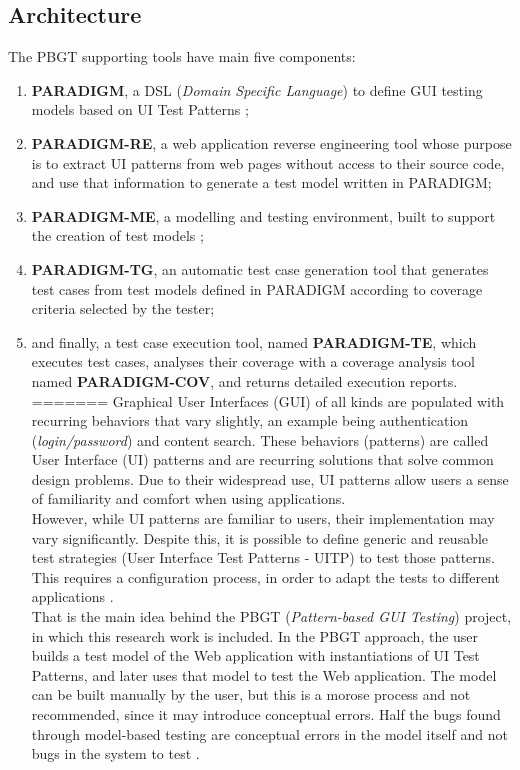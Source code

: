 \documentclass[conference]{IEEEtran}
\begin{document}
\subsection{Architecture}
The PBGT supporting tools have main five components: 
\begin{enumerate}
\item \textbf{PARADIGM}, a DSL (\textit{Domain Specific Language}) to define GUI testing models based on UI Test Patterns \cite{enase14}; 
\item \textbf{PARADIGM-RE}, a web application reverse engineering tool whose purpose is to extract UI patterns from web pages without access to their source code, and use that information to generate a test model written in PARADIGM; 
\item \textbf{PARADIGM-ME}, a modelling and testing environment, built to support the creation of test models \cite{conf_icst_MonteiroP13}; 
\item  \textbf{PARADIGM-TG}, an automatic test case generation tool that generates test cases from test models defined in PARADIGM according to coverage criteria selected by the tester; 
\item and finally, a test case execution tool, named \textbf{PARADIGM-TE}, which executes test cases, analyses their coverage with a coverage analysis tool named \textbf{PARADIGM-COV}\cite{vilela2014cov}, and returns detailed execution reports. 
=======
Graphical User Interfaces (GUI) of all kinds are populated with recurring behaviors that vary slightly, an example being authentication (\textit{login/password}) and content search. These behaviors (patterns) are called User Interface (UI) patterns \cite{van2001patterns} and are recurring solutions that solve common design problems. Due to their widespread use, UI patterns allow users a sense of familiarity and comfort when using applications. \\

However, while UI patterns are familiar to users, their implementation may vary significantly.  Despite this, it is possible to define generic and reusable test strategies (User Interface Test Patterns - UITP) to test those patterns. This requires a configuration process, in order to adapt the tests to different applications \cite{morgado2012gui}. \\

That is the main idea behind the PBGT (\textit{Pattern-based GUI Testing}) project, in which this research work is included. In the PBGT approach, the user builds a test model of the Web application with instantiations of UI Test Patterns, and later uses that model to test the Web application. The model can be built manually by the user, but this is a morose process and not recommended, since it may introduce conceptual errors. Half the bugs found through model-based testing are conceptual errors in the model itself and not bugs in the system to test \cite{dalal1999model}.\\


\end{enumerate}
\end{document}
